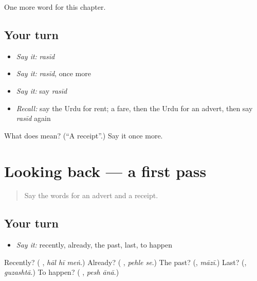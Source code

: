 \begin{grammarlens}[title={What you've built}]
One more word for this chapter.
\end{grammarlens}

\subsection*{Your turn}
\begin{itemize}
\raggedright
  \item \emph{Say it:} \emph{rasīd}
  \item \emph{Say it:} \emph{rasīd}, once more
  \item \emph{Say it:} say \emph{rasīd}
  \item \emph{Recall:} say the Urdu for rent; a fare, then the Urdu for an advert, then say \emph{rasīd} again
\end{itemize}

\begin{tcolorbox}[breakable,colback=teal!4,colframe=teal!35!black,title={Before you move on}]
What does  mean? (\textquotedblleft{}A receipt\textquotedblright{}.) Say it once more.
\end{tcolorbox}
\section[(dialogue)]{Looking back — a first pass}

\label{lesson:UR-R146-first-pass-looking-back}



\begin{quote}
Say the words for an advert and a receipt.
\end{quote}

\subsection*{Your turn}
\begin{itemize}
\raggedright
  \item \emph{Say it:} recently, already, the past, last, to happen
\end{itemize}

\begin{tcolorbox}[breakable,colback=teal!4,colframe=teal!35!black,title={Before you move on}]
Recently? (\textbf{  }, \emph{hāl hī meṅ}.) Already? (\textbf{ }, \emph{pehle se}.) The past? (\textbf{}, \emph{māzī}.) Last? (\textbf{}, \emph{guzashtā}.) To happen? (\textbf{ }, \emph{pesh ānā}.)
\end{tcolorbox}
